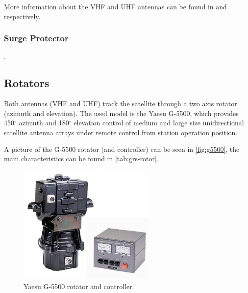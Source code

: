 More information about the VHF and UHF antennas can be found in \cite{2mcp14} and \cite{a719b} respectively.

\subsubsection{Surge Protector}

.

\subsection{Rotators}

Both antennas (VHF and UHF) track the satellite through a two axis rotator (azimuth and elevation). The used model is the Yaesu G-5500, which provides 450$^{\circ}$ azimuth and 180$^{\circ}$ elevation control of medium and large size unidirectional satellite antenna arrays under remote control from station operation position.

A picture of the G-5500 rotator (and controller) can be seen in \autoref{fig:g5500}, the main characteristics can be found in \autoref{tab:grs-rotor}.

\begin{figure}[!ht]
    \begin{center}
        \includegraphics[width=0.6\textwidth]{figures/g5500.jpg}
        \caption{Yaesu G-5500 rotator and controller.}
        \label{fig:g5500}
    \end{center}
\end{figure}

